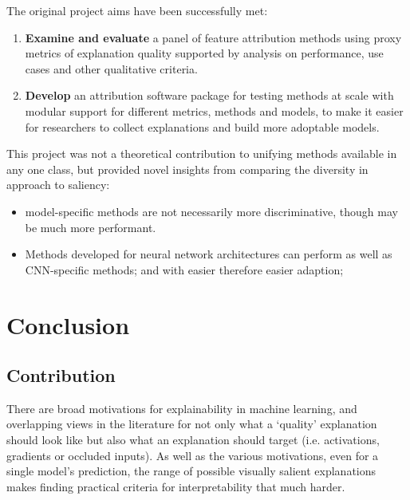 \documentclass[main]{subfiles}
\begin{document}
The original project aims have been successfully met:
\begin{enumerate}
	\item \textbf{Examine and evaluate} a panel of feature attribution methods using proxy metrics of explanation quality supported by analysis on performance, use cases and other qualitative criteria.

	\item \textbf{Develop} an attribution software package for testing methods at scale with modular support for different metrics, methods and models, to make it easier for researchers to collect explanations and build more adoptable models.

\end{enumerate}

This project was not a theoretical contribution to unifying methods available in any one class, but provided novel insights from comparing the diversity in approach to saliency:

\begin{itemize}
\item model-specific methods are not necessarily more discriminative, though may be much more performant.
\item Methods developed for neural network architectures can perform as well as CNN-specific methods; and with easier therefore easier adaption;
\end{itemize}


\chapter{Conclusion}

\section{Contribution}
There are broad motivations for explainability in machine learning, and overlapping views in the literature for not only what a `quality' explanation should look like but also what an explanation should target (i.e. activations, gradients or occluded inputs). As well as the various motivations, even for a single model's prediction, the range of possible visually salient explanations makes finding practical criteria for interpretability that much harder.
\end{document}
